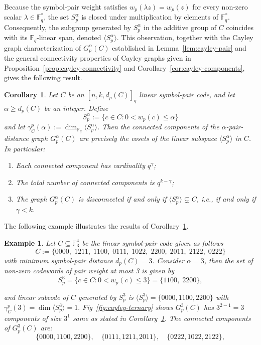 \documentclass[11pt,draftclsnofoot,journal,onecolumn]{IEEEtran}
\newtheorem{corollary}{Corollary}
\newtheorem{example}{Example}
\begin{document}
    Because the symbol-pair weight satisfies \(w_p(\lambda z) = w_p(z)\) for every non-zero scalar \(\lambda \in \mathbb{F}_q^*\), the set \(S^{\alpha}_p\) is closed under multiplication by elements of \(\mathbb{F}_q^*\). Consequently, the subgroup generated by \(S^{\alpha}_p\) in the additive group of \(C\) coincides with its \(\mathbb{F}_q\)-linear span, denoted \(\langle S^{\alpha}_p \rangle\). This observation, together with the Cayley graph characterization of \(G_p^{\alpha}(C)\) established in Lemma~\ref{lem:cayley-pair} and the general connectivity properties of Cayley graphs given in Proposition~\ref{prop:cayley-connectivity} and Corollary~\ref{cor:cayley-components}, gives the following result.

    \begin{corollary}\label{cor:cosets-pair}
    Let \(C\) be an $[n, k, d_p(C)]_q$ linear symbol-pair code, and let \(\alpha \ge d_p(C)\) be an integer. Define
    \[
        S^{\alpha}_p := \{ c \in C : 0 < w_p(c) \le \alpha \}
    \]
    and let \(\gamma_C^p(\alpha) := \dim_{\mathbb{F}_q} \langle S^{\alpha}_p \rangle\). Then the connected components of the \(\alpha\)-pair-distance graph \(G_p^{\alpha}(C)\) are precisely the cosets of the linear subspace \(\langle S^{\alpha}_p \rangle\) in \(C\). In particular:
    \begin{enumerate}
    \item Each connected component has cardinality \(q^{\gamma}\);
    \item The total number of connected components is \(q^{k-\gamma}\);
    \item The graph \(G_p^{\alpha}(C)\) is disconnected if and only if \(\langle S^{\alpha}_p \rangle \subsetneq C\), i.e., if and only if \(\gamma < k\).
    \end{enumerate}
    \end{corollary}

    The following example illustrates the results of Corollary~\ref{cor:cosets-pair}.


    
    \begin{example}
    Let \(C \subseteq \mathbb{F}_3^4\) be the linear symbol-pair code given as follows $$C := \{0000,\; 1211,\; 1100,\; 0111,\; 1022,\; 2200,\; 2011,\; 2122,\; 0222\}$$ with minimum symbol-pair distance \(d_p(C) = 3\).
    Consider \(\alpha = 3\), then the set of non-zero codewords of pair weight at most 3 is given by
    \[
    S^3_p = \{ c \in C : 0 < w_p(c) \le 3 \} = \{1100,\; 2200\},
    \]
    
    and linear subcode of $C$ generated by $S^3_p$ is $\langle S^{3}_p \rangle = \{0000, 1100, 2200\}$ with $ \gamma_C^p(3)=\dim\langle S^3_p\rangle = 1.$ Fig~\ref{fig:cayley-ternary} shows $G_p^{3}(C)$ has $3^{2-1}=3$ components of size $3^1$ same as stated in Corollary~\ref{cor:cosets-pair}. The connected components of $G_p^{3}(C)$ are:
    \[
    \{0000,1100,2200\},\quad \{0111,1211,2011\},\quad \{0222,1022,2122\},
    \] 
    \end{example}
\end{document}
